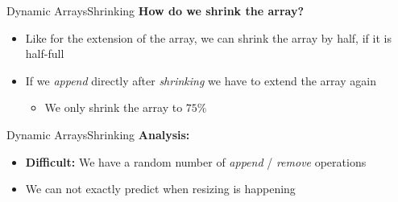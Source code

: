 


\begin{frame}{Dynamic Arrays}{Shrinking}
  \textbf{How do we shrink the array?}
  \begin{itemize}
    \item
      Like for the extension of the array, we can
      shrink the array by half, if it is half-full
    \item
      If we \textit{append} directly after \textit{shrinking} we have to
      extend the array again
      \begin{itemize}
        \item
          We only shrink the array to $75\%$ 
       \end{itemize}
  \end{itemize}
\end{frame}


\begin{frame}{Dynamic Arrays}{Shrinking}
  \textbf{Analysis:}
  \begin{itemize}
    \item
      \textbf{Difficult:}
      We have a random number of \textit{append} / \textit{remove} operations
    \item
      We can not exactly predict when resizing is happening
  \end{itemize}
\end{frame}
